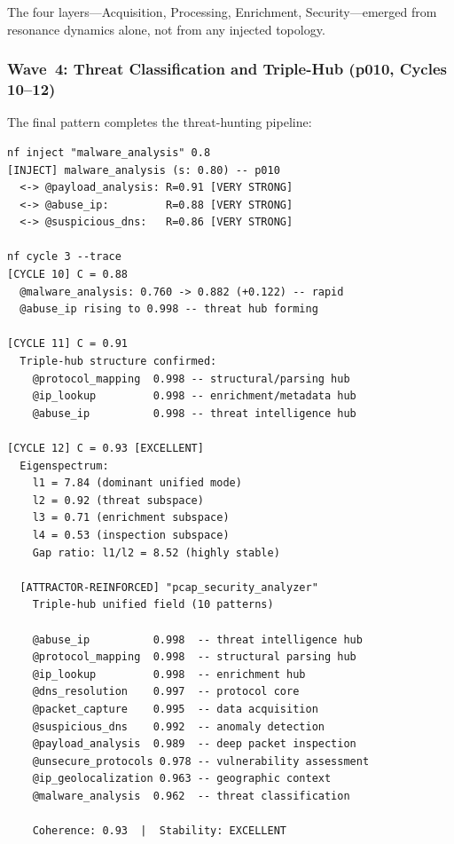 \noindent
The four layers---Acquisition, Processing, Enrichment,
Security---emerged from resonance dynamics alone, not from any
injected topology.

\subsubsection*{Wave~4: Threat Classification and Triple-Hub
  (p010, Cycles 10--12)}

The final pattern completes the threat-hunting pipeline:

\begin{terminalbox}
\begin{lstlisting}[style=neosshell]
nf inject "malware_analysis" 0.8
[INJECT] malware_analysis (s: 0.80) -- p010
  <-> @payload_analysis: R=0.91 [VERY STRONG]
  <-> @abuse_ip:         R=0.88 [VERY STRONG]
  <-> @suspicious_dns:   R=0.86 [VERY STRONG]

nf cycle 3 --trace
[CYCLE 10] C = 0.88
  @malware_analysis: 0.760 -> 0.882 (+0.122) -- rapid
  @abuse_ip rising to 0.998 -- threat hub forming

[CYCLE 11] C = 0.91
  Triple-hub structure confirmed:
    @protocol_mapping  0.998 -- structural/parsing hub
    @ip_lookup         0.998 -- enrichment/metadata hub
    @abuse_ip          0.998 -- threat intelligence hub

[CYCLE 12] C = 0.93 [EXCELLENT]
  Eigenspectrum:
    l1 = 7.84 (dominant unified mode)
    l2 = 0.92 (threat subspace)
    l3 = 0.71 (enrichment subspace)
    l4 = 0.53 (inspection subspace)
    Gap ratio: l1/l2 = 8.52 (highly stable)

  [ATTRACTOR-REINFORCED] "pcap_security_analyzer"
    Triple-hub unified field (10 patterns)

    @abuse_ip          0.998  -- threat intelligence hub
    @protocol_mapping  0.998  -- structural parsing hub
    @ip_lookup         0.998  -- enrichment hub
    @dns_resolution    0.997  -- protocol core
    @packet_capture    0.995  -- data acquisition
    @suspicious_dns    0.992  -- anomaly detection
    @payload_analysis  0.989  -- deep packet inspection
    @unsecure_protocols 0.978 -- vulnerability assessment
    @ip_geolocalization 0.963 -- geographic context
    @malware_analysis  0.962  -- threat classification

    Coherence: 0.93  |  Stability: EXCELLENT
\end{lstlisting}
\end{terminalbox}

